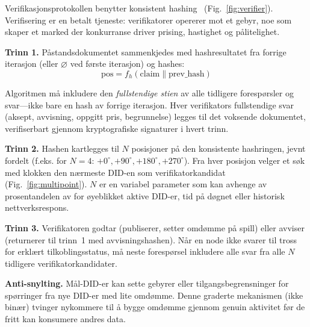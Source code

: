 \documentclass[11pt,a4paper,twocolumn]{article}
\begin{document}
Verifikasjonsprotokollen benytter konsistent hashing~\cite{karger1997} (Fig.~\ref{fig:verifier}). Verifisering er en betalt tjeneste: verifikatorer opererer mot et gebyr, noe som skaper et marked der konkurranse driver prising, hastighet og pålitelighet.

\textbf{Trinn 1.} Påstandsdokumentet sammenkjedes med hashresultatet fra forrige iterasjon (eller $\varnothing$ ved første iterasjon) og hashes:
\begin{equation}
\text{pos} = f_h(\text{claim} \| \text{prev\_hash})
\label{eq:hash}
\end{equation}

Algoritmen må inkludere den \emph{fullstendige stien} av alle tidligere forespørsler og svar---ikke bare en hash av forrige iterasjon. Hver verifikators fullstendige svar (aksept, avvisning, oppgitt pris, begrunnelse) legges til det voksende dokumentet, verifiserbart gjennom kryptografiske signaturer i hvert trinn.

\textbf{Trinn 2.} Hashen kartlegges til $N$ posisjoner på den konsistente hashringen, jevnt fordelt (f.eks. for $N=4$: $+0^{\circ}, +90^{\circ}, +180^{\circ}, +270^{\circ}$). Fra hver posisjon velger et søk med klokken den nærmeste DID-en som verifikatorkandidat (Fig.~\ref{fig:multipoint}). $N$ er en variabel parameter som kan avhenge av prosentandelen av for øyeblikket aktive DID-er, tid på døgnet eller historisk nettverksrespons.

\textbf{Trinn 3.} Verifikatoren godtar (publiserer, setter omdømme på spill) eller avviser (returnerer til trinn~1 med avvisningshashen). Når en node ikke svarer til tross for erklært tilkoblingsstatus, må neste forespørsel inkludere alle svar fra alle $N$ tidligere verifikatorkandidater.

\textbf{Anti-snylting.} Mål-DID-er kan sette gebyrer eller tilgangsbegrensninger for spørringer fra nye DID-er med lite omdømme. Denne graderte mekanismen (ikke binær) tvinger nykommere til å bygge omdømme gjennom genuin aktivitet før de fritt kan konsumere andres data.
\end{document}
